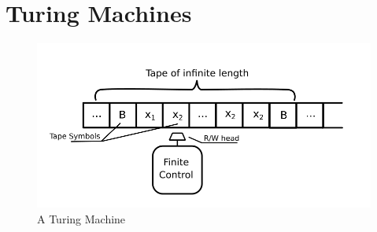 \section{Turing Machines}
\begin{figure}[h!]	
	\includegraphics[width=1\textwidth]{images/TuringMachine.png}\par
	\caption{A Turing Machine}
	\label{fig:turingmachine}
\end{figure}

